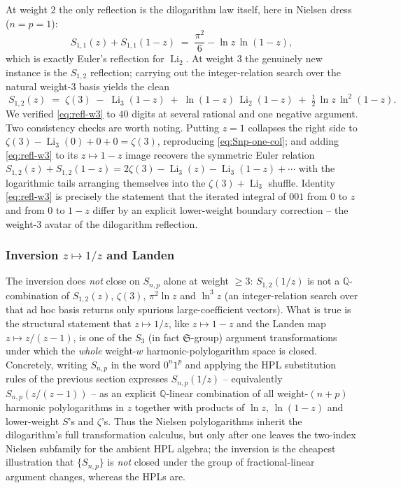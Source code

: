 \documentclass[11pt]{article}
\DeclareMathOperator{\Li}{Li}
\theoremstyle{plain}
\theoremstyle{remark}
\begin{document}
At weight $2$ the only reflection is the dilogarithm law itself, here in Nielsen dress ($n=p=1$):
\begin{equation}\label{eq:refl-w2}
  S_{1,1}(z)+S_{1,1}(1-z)\;=\;\frac{\pi^2}{6}-\ln z\,\ln(1-z),
\end{equation}
which is exactly Euler's reflection for $\Li_2$. At weight $3$ the genuinely new instance is the $S_{1,2}$ reflection; carrying out the integer-relation search over the natural weight-$3$ basis yields the clean
\begin{equation}\label{eq:refl-w3}
  \boxed{\;S_{1,2}(z)\;=\;\zeta(3)\;-\;\Li_3(1-z)\;+\;\ln(1-z)\,\Li_2(1-z)\;+\;\tfrac12\,\ln z\,\ln^{2}(1-z).\;}
\end{equation}
We verified \eqref{eq:refl-w3} to $40$ digits at several rational and one negative argument. Two consistency checks are worth noting. Putting $z=1$ collapses the right side to $\zeta(3)-\Li_3(0)+0+0=\zeta(3)$, reproducing \eqref{eq:Snp-one-col}; and adding \eqref{eq:refl-w3} to its $z\mapsto1-z$ image recovers the symmetric Euler relation $S_{1,2}(z)+S_{1,2}(1-z)=2\zeta(3)-\Li_3(z)-\Li_3(1-z)+\cdots$ with the logarithmic tails arranging themselves into the $\zeta(3)+\Li_3$ shuffle. Identity \eqref{eq:refl-w3} is precisely the statement that the iterated integral of $001$ from $0$ to $z$ and from $0$ to $1-z$ differ by an explicit lower-weight boundary correction -- the weight-$3$ avatar of the dilogarithm reflection.

\subsubsection*{Inversion $z\mapsto 1/z$ and Landen}

The inversion does \emph{not} close on $S_{n,p}$ alone at weight $\ge3$: $S_{1,2}(1/z)$ is not a $\mathbb{Q}$-combination of $S_{1,2}(z)$, $\zeta(3)$, $\pi^2\ln z$ and $\ln^3 z$ (an integer-relation search over that ad hoc basis returns only spurious large-coefficient vectors). What is true is the structural statement that $z\mapsto 1/z$, like $z\mapsto1-z$ and the Landen map $z\mapsto z/(z-1)$, is one of the $S_3$ (in fact $\mathfrak{S}$-group) argument transformations under which the \emph{whole} weight-$w$ harmonic-polylogarithm space is closed. Concretely, writing $S_{n,p}$ in the word $0^{n}1^{p}$ and applying the HPL substitution rules of the previous section expresses $S_{n,p}(1/z)$ -- equivalently $S_{n,p}(z/(z-1))$ -- as an explicit $\mathbb{Q}$-linear combination of all weight-$(n+p)$ harmonic polylogarithms in $z$ together with products of $\ln z$, $\ln(1-z)$ and lower-weight $S$'s and $\zeta$'s. Thus the Nielsen polylogarithms inherit the dilogarithm's full transformation calculus, but only after one leaves the two-index Nielsen subfamily for the ambient HPL algebra; the inversion is the cheapest illustration that $\{S_{n,p}\}$ is \emph{not} closed under the group of fractional-linear argument changes, whereas the HPLs are.
\end{document}
